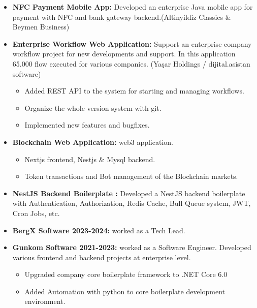 \documentclass[line,margin]{res}
\begin{document}
\begin{resume}
\begin{itemize}
\begin{itemize}
                         \end{itemize}
                 \item \textbf{NFC Payment Mobile App: } Developed an enterprise Java mobile app for payment with NFC and bank gateway backend.(Altinyildiz Classics \& Beymen Business) 
                 \item \textbf{Enterprise Workflow Web Application: } Support an enterprise company workflow project for new developments and support. In this application 65.000 flow executed for various companies. (Yaşar Holdings / dijital.asistan software) 
                         \begin{itemize}
                                         \item Added REST API to the system for starting and managing workflows.
                                         \item Organize the whole version system with git.
                                         \item Implemented new features and bugfixes.
                         \end{itemize}
                \item \textbf{Blockchain Web Application: } web3 application.
                \begin{itemize} 
                                \item Nextjs frontend, Nestjs \& Mysql backend.
                                \item Token transactions and Bot management of the Blockchain markets.
                \end{itemize}
                \item \textbf{NestJS Backend Boilerplate : } Developed a NestJS backend boilerplate with Authentication, Authorization, Redis Cache, Bull Queue system, JWT, Cron Jobs, etc. 
                \item \textbf{BergX Software 2023-2024: } worked as a Tech Lead.
                \item \textbf{Gunkom Software 2021-2023: } worked as a Software Engineer. Developed various frontend and backend projects at enterprise level. 
                         \begin{itemize}
                                         \item Upgraded company core boilerplate framework to .NET Core 6.0
                                         \item Added Automation with python to core boilerplate development environment.

\end{itemize}
\end{itemize}
\end{resume}
\end{document}
